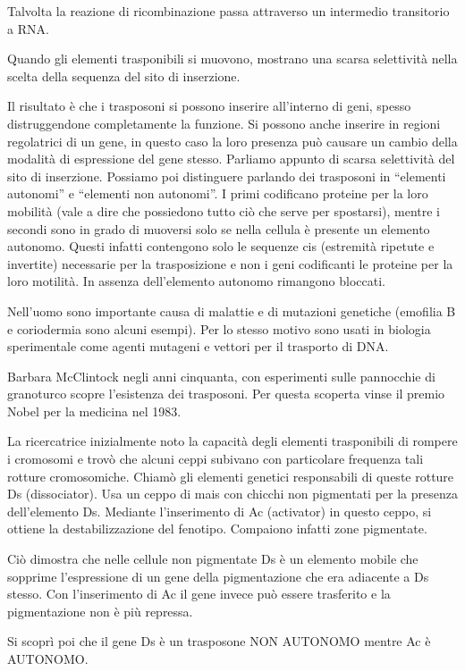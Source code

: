 \documentclass[11pt]{book}
\begin{document}
Talvolta la reazione di ricombinazione passa attraverso un intermedio
transitorio a RNA.

Quando gli elementi trasponibili si muovono, mostrano una scarsa
selettività nella scelta della sequenza del sito di inserzione.

Il risultato è che i trasposoni si possono inserire all'interno di geni,
spesso distruggendone completamente la funzione. Si possono anche
inserire in regioni regolatrici di un gene, in questo caso la loro
presenza può causare un cambio della modalità di espressione del gene
stesso. Parliamo appunto di scarsa selettività del sito di inserzione.
Possiamo poi distinguere parlando dei trasposoni in ``elementi
autonomi'' e ``elementi non autonomi''. I primi codificano proteine per
la loro mobilità (vale a dire che possiedono tutto ciò che serve per
spostarsi), mentre i secondi sono in grado di muoversi solo se nella
cellula è presente un elemento autonomo. Questi infatti contengono solo
le sequenze cis (estremità ripetute e invertite) necessarie per la
trasposizione e non i geni codificanti le proteine per la loro motilità.
In assenza dell'elemento autonomo rimangono bloccati.

Nell'uomo sono importante causa di malattie e di mutazioni genetiche
(emofilia B e coriodermia sono alcuni esempi). Per lo stesso motivo sono
usati in biologia sperimentale come agenti mutageni e vettori per il
trasporto di DNA.

Barbara McClintock negli anni cinquanta, con esperimenti sulle
pannocchie di granoturco scopre l'esistenza dei trasposoni. Per questa
scoperta vinse il premio Nobel per la medicina nel 1983.

La ricercatrice inizialmente noto la capacità degli elementi
trasponibili di rompere i cromosomi e trovò che alcuni ceppi subivano
con particolare frequenza tali rotture cromosomiche. Chiamò gli elementi
genetici responsabili di queste rotture Ds (dissociator). Usa un ceppo
di mais con chicchi non pigmentati per la presenza dell'elemento Ds.
Mediante l'inserimento di Ac (activator) in questo ceppo, si ottiene la
destabilizzazione del fenotipo. Compaiono infatti zone pigmentate.

Ciò dimostra che nelle cellule non pigmentate Ds è un elemento mobile
che sopprime l'espressione di un gene della pigmentazione che era
adiacente a Ds stesso. Con l'inserimento di Ac il gene invece può essere
trasferito e la pigmentazione non è più repressa.

Si scoprì poi che il gene Ds è un trasposone NON AUTONOMO mentre Ac è
AUTONOMO.
\end{document}
